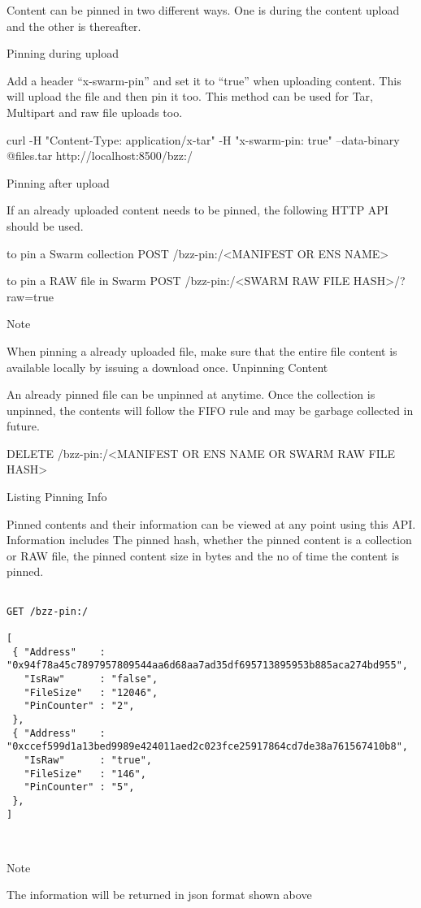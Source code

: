 Content can be pinned in two different ways. One is during the content upload and the other is thereafter.

    Pinning during upload

    Add a header “x-swarm-pin” and set it to “true” when uploading content. This will upload the file and then pin it too. This method can be used for Tar, Multipart and raw file uploads too.

curl -H "Content-Type: application/x-tar" -H "x-swarm-pin: true"  --data-binary @files.tar http://localhost:8500/bzz:/

    Pinning after upload

    If an already uploaded content needs to be pinned, the following HTTP API should be used.

to pin a Swarm collection
POST /bzz-pin:/<MANIFEST OR ENS NAME>

to pin a RAW file in Swarm
POST /bzz-pin:/<SWARM RAW FILE HASH>/?raw=true

Note

When pinning a already uploaded file, make sure that the entire file content is available locally by issuing a download once.
Unpinning Content

An already pinned file can be unpinned at anytime. Once the collection is unpinned, the contents will follow the FIFO rule and may be garbage collected in future.

DELETE /bzz-pin:/<MANIFEST OR ENS NAME OR SWARM RAW FILE HASH>

Listing Pinning Info

Pinned contents and their information can be viewed at any point using this API. Information includes The pinned hash, whether the pinned content is a collection or RAW file, the pinned content size in bytes and the no of time the content is pinned.


\begin{lstlisting}

GET /bzz-pin:/

[
 { "Address"    : "0x94f78a45c7897957809544aa6d68aa7ad35df695713895953b885aca274bd955",
   "IsRaw"      : "false",
   "FileSize"   : "12046",
   "PinCounter" : "2",
 },
 { "Address"    : "0xccef599d1a13bed9989e424011aed2c023fce25917864cd7de38a761567410b8",
   "IsRaw"      : "true",
   "FileSize"   : "146",
   "PinCounter" : "5",
 },
]

    
\end{lstlisting}
Note

The information will be returned in json format shown above
